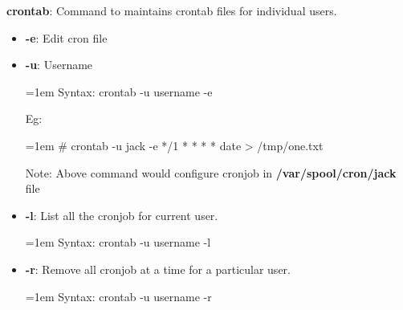 \setlength{\columnsep}{3pt}
\begin{flushleft}
	\textbf{crontab}: Command to maintains crontab files for individual users.
	\begin{itemize}
		\item \textbf{-e}: Edit cron file
		\item \textbf{-u}:  Username
		\bigskip
		\begin{tcolorbox}[breakable,notitle,boxrule=-0pt,colback=pink,colframe=pink]
			\color{black}
			\font=1em
			Syntax: crontab -u username -e
			\font=4pt
		\end{tcolorbox}
		Eg:
		\begin{tcolorbox}[breakable,notitle,boxrule=-0pt,colback=black,colframe=black]
			\color{green}
			\font=1em
			\# crontab -u jack -e
			\newline
			*/1 	* 	*	*	*   date > /tmp/one.txt
			\font=4pt
		\end{tcolorbox}
		\bigskip
		\begin{tcolorbox}[breakable,notitle,boxrule=1pt,colback=yellow,colframe=yellow]
		\color{black}
			Note: Above command would configure cronjob in \textbf{/var/spool/cron/jack} file
		\end{tcolorbox}
		
		\bigskip
		
		\item \textbf{-l}: List all the cronjob for current user.
		\bigskip
		\begin{tcolorbox}[breakable,notitle,boxrule=-0pt,colback=pink,colframe=pink]
			\color{black}
			\font=1em
			Syntax: crontab -u username -l
			\font=4pt
		\end{tcolorbox}
		
		
		\bigskip
		
		\item \textbf{-r}: Remove all cronjob at a time for a particular user.
		\bigskip
		\begin{tcolorbox}[breakable,notitle,boxrule=-0pt,colback=pink,colframe=pink]
			\color{black}
			\font=1em
			Syntax: crontab -u username -r	
			\font=4pt
		\end{tcolorbox}
		
	\end{itemize}


\end{flushleft}
\newpage


